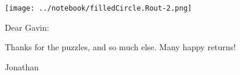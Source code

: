 \documentclass[12pt]{article}
\begin{document}
\thispagestyle{empty}

\setlength{\parindent}{0em}
\setlength{\parskip}{2ex}
\setlength{\textheight}{9in}

\vspace*{-1.5in}
\hspace*{-1in}
\texttt{[image: ../notebook/filledCircle.Rout-2.png]}
\vspace*{-1in}

\LARGE

Dear Gavin:

Thanks for the puzzles, and so much else. Many happy returns!

Jonathan
\end{document}
